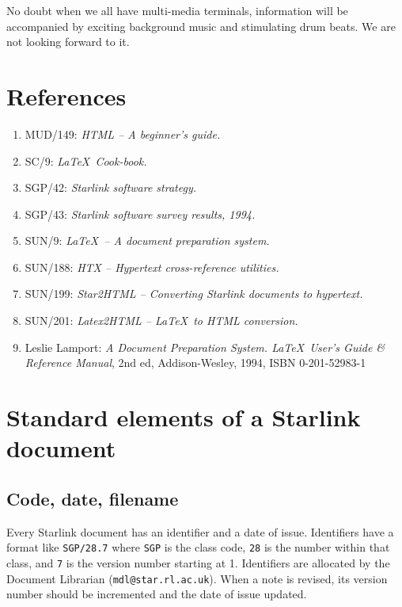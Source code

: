 \documentclass[twoside,11pt]{article}
\newcommand{\xref}[3]{#1}
\begin{document}
No doubt when we all have multi-media terminals, information will be
accompanied by exciting background music and stimulating drum beats.
We are not looking forward to it.

\section{References}

\begin{enumerate}
\item MUD/149: {\em HTML -- A beginner's guide.}
\item \xref{SC/9}{sc9}{}: {\em \LaTeX\ Cook-book.}
\item \xref{SGP/42}{sgp42}{}: {\em Starlink software strategy.}
\item SGP/43: {\em Starlink software survey results, 1994.}
\item \xref{SUN/9}{sun9}{}: {\em \LaTeX\ -- A document preparation system.}
\item \xref{SUN/188}{sun188}{}: {\em HTX -- Hypertext cross-reference utilities.}
\item \xref{SUN/199}{sun199}{}: {\em Star2HTML -- Converting Starlink documents
  to hypertext.}
\item \xref{SUN/201}{sun201}{}: {\em Latex2HTML -- \LaTeX\ to HTML conversion.}
\item Leslie Lamport: {\em A Document Preparation System. \LaTeX\ User's
Guide \& Reference Manual}, 2nd ed, Addison-Wesley, 1994,
ISBN 0-201-52983-1
\end{enumerate}

\appendix

\newpage

\section{Standard elements of a Starlink document}

\subsection{Code, date, filename}

Every Starlink document has an identifier and a date of issue.
Identifiers have a format like {\tt SGP/28.7} where {\tt SGP} is the class code,
{\tt 28} is the number within that class, and {\tt 7} is the version number
starting at 1.
Identifiers are allocated by the Document Librarian 
({\tt mdl@star.rl.ac.uk}).
When a note is revised, its version number should be incremented and the
date of issue updated.
\end{document}
